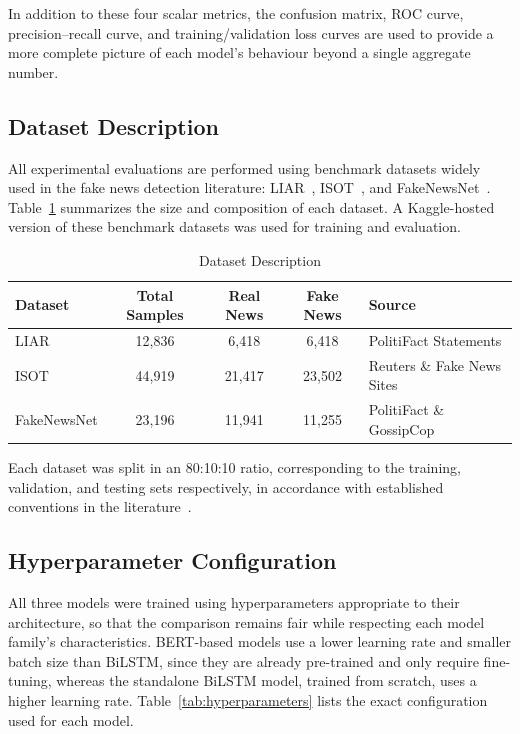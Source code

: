 In addition to these four scalar metrics, the confusion matrix, ROC curve, precision--recall curve, and training/validation loss curves are used to provide a more complete picture of each model's behaviour beyond a single aggregate number.

\subsection{Dataset Description}

All experimental evaluations are performed using benchmark datasets widely used in the fake news detection literature: LIAR~\citep{Wang2017Liar}, ISOT~\citep{ISOTDataset}, and FakeNewsNet~\citep{Shu2020FakeNewsNet}. Table~\ref{tab:datasets} summarizes the size and composition of each dataset. A Kaggle-hosted version of these benchmark datasets was used for training and evaluation.

\begin{table}[h]
\centering
\caption{Dataset Description}
\label{tab:datasets}
\begin{tabular}{|l|c|c|c|l|}
\hline
\textbf{Dataset} & \textbf{Total Samples} & \textbf{Real News} & \textbf{Fake News} & \textbf{Source} \\ \hline
LIAR & 12,836 & 6,418 & 6,418 & PolitiFact Statements \\
ISOT & 44,919 & 21,417 & 23,502 & Reuters \& Fake News Sites \\
FakeNewsNet & 23,196 & 11,941 & 11,255 & PolitiFact \& GossipCop \\ \hline
\end{tabular}
\end{table}

Each dataset was split in an 80:10:10 ratio, corresponding to the training, validation, and testing sets respectively, in accordance with established conventions in the literature~\citep{Kaliyar2021FakeBERT,Rai2022FakeNews}.

\subsection{Hyperparameter Configuration}

All three models were trained using hyperparameters appropriate to their architecture, so that the comparison remains fair while respecting each model family's characteristics. BERT-based models use a lower learning rate and smaller batch size than BiLSTM, since they are already pre-trained and only require fine-tuning, whereas the standalone BiLSTM model, trained from scratch, uses a higher learning rate. Table~\ref{tab:hyperparameters} lists the exact configuration used for each model.

